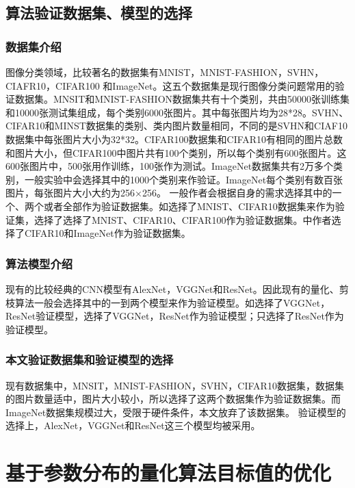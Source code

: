 \documentclass[ pdftex, oneside, master]{NJUthesis}
\begin{document}
\section{算法验证数据集、模型的选择}

\subsection{数据集介绍}
图像分类领域，比较著名的数据集有MNIST\cite{lenet}，MNIST-FASHION，SVHN，CIAFR10\cite{cifar}，CIFAR100 和ImageNet\cite{alexnet}。这五个数据集是现行图像分类问题常用的验证数据集。MNSIT和MNIST-FASHION数据集共有十个类别，共由50000张训练集和10000张测试集组成，每个类别6000张图片。其中每张图片均为28*28。SVHN、CIFAR10和MINST数据集的类别、类内图片数量相同，不同的是SVHN和CIAF10数据集中每张图片大小为32*32。CIFAR100数据集和CIFAR10有相同的图片总数和图片大小，但CIFAR100中图片共有100个类别，所以每个类别有600张图片。这600张图片中，500张用作训练，100张作为测试。ImageNet数据集共有2万多个类别，一般实验中会选择其中的1000个类别来作验证。ImageNet每个类别有数百张图片，每张图片大小大约为256×256。
一般作者会根据自身的需求选择其中的一个、两个或者全部作为验证数据集。如\cite{17}选择了MNIST、CIFAR10数据集来作为验证集，\cite{28}选择了选择了MNIST、CIFAR10、CIFAR100作为验证数据集。\cite{27}中作者选择了CIFAR10和ImageNet作为验证数据集。

\subsection{算法模型介绍}
现有的比较经典的CNN模型有AlexNet，VGGNet和ResNet。因此现有的量化、剪枝算法一般会选择其中的一到两个模型来作为验证模型。如\cite{17}选择了VGGNet，ResNet验证模型，\cite{28}选择了VGGNet，ResNet作为验证模型；\cite{27}只选择了ResNet作为验证模型。

\subsection{本文验证数据集和验证模型的选择}
现有数据集中，MNSIT，MNIST-FASHION，SVHN，CIFAR10数据集，数据集的图片数量适中，图片大小较小，所以选择了这两个数据集作为验证数据集。而ImageNet数据集规模过大，受限于硬件条件，本文放弃了该数据集。
验证模型的选择上，AlexNet，VGGNet和ResNet这三个模型均被采用。



\chapter{基于参数分布的量化算法目标值的优化}
\end{document}
